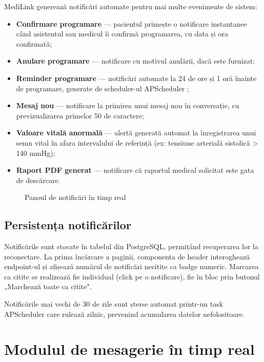 MediLink generează notificări automate pentru mai multe evenimente de sistem:

\begin{itemize}
  \item \textbf{Confirmare programare} --- pacientul primește o notificare instantanee când asistentul sau medicul îi confirmă programarea, cu data și ora confirmată;
  \item \textbf{Anulare programare} --- notificare cu motivul anulării, dacă este furnizat;
  \item \textbf{Reminder programare} --- notificări automate la 24 de ore și 1 oră înainte de programare, generate de scheduler-ul APScheduler \cite{apscheduler2024};
  \item \textbf{Mesaj nou} --- notificare la primirea unui mesaj nou în conversație, cu previzualizarea primelor 50 de caractere;
  \item \textbf{Valoare vitală anormală} --- alertă generată automat la înregistrarea unui semn vital în afara intervalului de referință (ex: tensiune arterială sistolică > 140 mmHg);
  \item \textbf{Raport PDF generat} --- notificare că raportul medical solicitat este gata de descărcare.
\end{itemize}

\begin{figure}[H]
  \centering
  \caption{Panoul de notificări în timp real}
  \label{fig:notificari}
\end{figure}

\subsection{Persistența notificărilor}

Notificările sunt stocate în tabelul  din PostgreSQL, permițând recuperarea lor la reconectare. La prima încărcare a paginii, componenta de header interoghează endpoint-ul  și afișează numărul de notificări necitite ca badge numeric. Marcarea ca citite se realizează fie individual (click pe o notificare), fie în bloc prin butonul „Marchează toate ca citite".

Notificările mai vechi de 30 de zile sunt șterse automat printr-un task APScheduler care rulează zilnic, prevenind acumularea datelor nefolositoare.

\section{Modulul de mesagerie în timp real}

